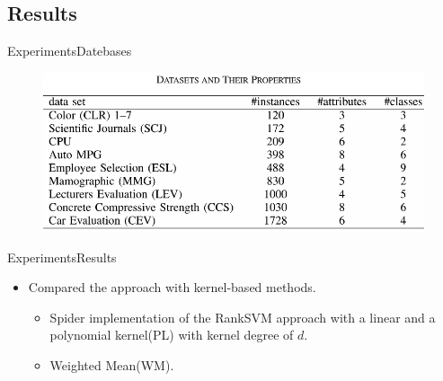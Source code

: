 \documentclass[]{beamer}
\newcommand{\Xtri}{$\blacktriangleright$ }
\newcommand{\itemXtri}{\item[\Xtri]}
\renewcommand{\|}[1][.3em]{\hspace{#1}|\hspace{#1}}
\renewcommand{\,}[1][.3em]{,\hspace{#1}}
\begin{document}
\subsection{Results}
\begin{frame}{Experiments}{Datebases}
    \begin{figure}
        \centering
        \includegraphics[width=.8\textwidth]{db}
    \end{figure}
\end{frame}
\begin{frame}{Experiments}{Results}
    \begin{figure}
        \centering
    \end{figure}
    \begin{itemize}
    \item[] Compared the approach with kernel-based methods.
        \begin{itemize}
            \itemXtri Spider implementation of the RankSVM approach with a linear and a polynomial kernel(PL) with kernel degree of $d$.
            \itemXtri Weighted Mean(WM). 
    \end{itemize}         
    \end{itemize}
\end{frame}
\end{document}
